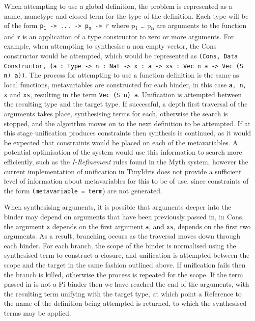 \documentclass[a4paper]{article}
\begin{document}
When attempting to use a global definition, the problem is represented as a
name, nametype and closed term for the type of the definition. Each type will be of the form
\texttt{p\textsubscript{1} -> ... -> p\textsubscript{n} -> r} where p\textsubscript{1} \ldots{} p\textsubscript{n} are 
arguments to the function and r is an application of a type constructor
to zero or more arguments. For example, when attempting to synthesise a non empty vector,
the Cons constructor would be attempted, which would be represented as
\texttt{(Cons, Data Constructor, (a : Type -> n : Nat -> x : a -> xs : Vec n a -> Vec (S n) a))}.
The process for attempting to use a function definition is the same as local functions,
metavariables are constructed for each binder, in this case \texttt{a, n, x} and \texttt{xs},
resulting in the term \texttt{Vec (S n) a}.
Unification is attempted between the resulting type and the target type. If 
successful, a depth first traversal of the arguments takes place, synthesising terms for 
each, otherwise the search is stopped, and the algorithm
moves on to the next definition to be attempted. If at this stage unification
produces constraints then synthesis is continued, as it would be expected that
constraints would be placed on each of the metavariables. A potential optimisation of
the system would use this information to search more efficiently, such as the \textit{I-Refinement}
rules found in the Myth system, however the current implementation of unification in 
TinyIdris does not provide a sufficient level of information about metavariables for this to
be of use, since constraints of the form \texttt{(metavariable = term}) are not generated. 

When synthesising arguments, it is possible that arguments deeper into the binder
may depend on arguments that have been previously passed in, in Cons, the argument \texttt{x}
depends on the first argument \texttt{a}, and \texttt{xs}, depends on the first two arguments.
As a result, branching occurs as the traversal moves down through each binder. For each branch, the scope of the binder
is normalised using the synthesised term to construct a closure, and unification is 
attempted between the scope and the target in the same fashion outlined above. 
If unification fails then the branch is killed, otherwise the process is repeated for the 
scope. If the term passed in is not a Pi binder then we have reached the end of the 
arguments, with the resulting term unifying with the target type, at which point a
Reference to the name of the definition being attempted is returned, to which the synthesised terms may be applied. 
\end{document}
